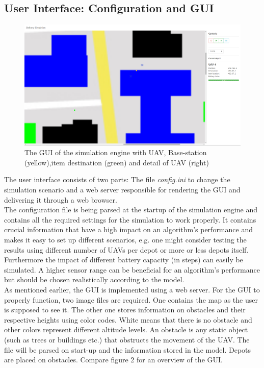 \subsection{User Interface: Configuration and GUI}
\begin{figure}[htbp]\label{fig:gui}
	\centering
	\includegraphics[width=\textwidth]{images/gui}
	\caption{The GUI of the simulation engine with UAV, Base-station (yellow),item destination (green) and detail of UAV (right)}
\end{figure}
The user interface consists of two parts: The file \textit{config.ini} to change the simulation scenario and a web server responsible for rendering the GUI and delivering it through a web browser.\\
The configuration file is being parsed at the startup of the simulation engine and contains all the required settings for the simulation to work properly. It contains crucial information that have a high impact on an algorithm's performance and makes it easy to set up different scenarios, e.g. one might consider testing the results using different number of UAVs per depot or more or less depots itself.
Furthermore the impact of different battery capacity (in steps) can easily be simulated. A higher sensor range can be beneficial for an algorithm's performance but should be chosen realistically according to the model.\\
As mentioned earlier, the GUI is implemented using a web server. For the GUI to properly function, two image files are required. One contains the map as the user is supposed to see it. The other one stores information on obstacles and their respective heights using color codes. White means that there is no obstacle and other colors represent different altitude levels. An obstacle is any static object (such as trees or buildings etc.) that obstructs the movement of the UAV. The file will be parsed on start-up and the information stored in the model.  Depots are placed on obstacles. Compare figure 2 for an overview of the GUI.\\
